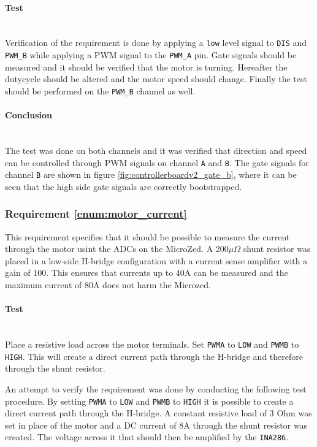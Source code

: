 \paragraph{Test}~\\
Verification of the requirement is done by applying a \texttt{low} level signal to \texttt{DIS} and \texttt{PWM\_B} while applying a PWM signal to the \texttt{PWM\_A} pin.
Gate signals should be measured and it should be verified that the motor is turning.
Hereafter the dutycycle should be altered and the motor speed should change.
Finally the test should be performed on the \texttt{PWM\_B} channel as well.

\paragraph{Conclusion}~\\
The test was done on both channels and it was verified that direction and speed can be controlled through PWM signals on channel \texttt{A} and \texttt{B}.
The gate signals for channel \texttt{B} are shown in figure \ref{fig:controllerboardv2_gate_b}, where it can be seen that the high side gate signals are correctly bootstrapped.


\subsubsection{Requirement \ref{enum:motor_current}} %
\label{ssub:requrement_enum:motor_current_}
This requirement specifies that it should be possible to measure the current through the motor usint the ADCs on the MicroZed.
A 200$\mu \Omega$ shunt resistor was placed in a low-side H-bridge configuration with a current sense amplifier with a gain of 100.
This ensures that currents up to 40A can be measured and the maximum current of 80A does not harm the Microzed.

\paragraph{Test}~\\
Place a resistive load across the motor terminals.
Set \texttt{PWMA} to \texttt{LOW} and \texttt{PWMB} to \texttt{HIGH}.
This will create a direct current path through the H-bridge and therefore through the shunt resistor.

An attempt to verify the requirement was done by conducting the following test procedure.
By setting \texttt{PWMA} to \texttt{LOW} and \texttt{PWMB} to \texttt{HIGH} it is possible to create a direct current path through the H-bridge.
A constant resistive load of 3 Ohm was set in place of the motor and a DC current of 8A through the shunt resistor was created.
The voltage across it that should then be amplified by the \texttt{INA286}.

